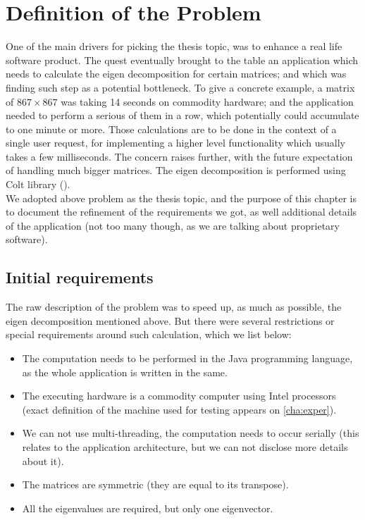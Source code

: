 \chapter{Definition of the Problem}
\label{cha:defn-prob}

One of the main drivers for picking the thesis topic, was to enhance a
real life software product. The quest eventually
brought to the table an application which needs to calculate
the eigen decomposition for certain matrices; and which was finding such step
as a potential bottleneck. To give a concrete example, a matrix of  $867
\times 867$ was taking 14 seconds on commodity hardware; and the
application needed to perform a serious of them in a row, which
potentially could accumulate to one minute or more. Those calculations are
to be done in the context of a single user request, for implementing
a higher level functionality which usually takes a few milliseconds.
The concern raises further, with the future expectation of handling
much bigger matrices. The eigen decomposition is performed using Colt
library (\cite{colt}).\\ 

We adopted above problem as the thesis topic, and the purpose of this
chapter is to document the refinement of the
requirements we got, as well additional details of
the application (not too many though, as we are talking about proprietary
software). 

\section{Initial requirements}

The raw description of the problem was to speed up, as much as
possible, the eigen decomposition mentioned above. But
there were several restrictions or special requirements around such
calculation, which we list below:

\begin{itemize}
  \item The computation needs to be performed in the Java programming
    language, as the whole application is written in the same. 
  \item The executing hardware is a commodity computer using Intel
    processors (exact definition of the machine used for testing
    appears on \cref{cha:exper}).
  \item We can not use multi-threading, the computation needs to occur
    serially (this relates to the application architecture, but we can
    not disclose more details about it). 
  \item The matrices are symmetric (they are equal to its transpose). 
  \item All the eigenvalues are required, but only one eigenvector.
\end{itemize}
\hfill

